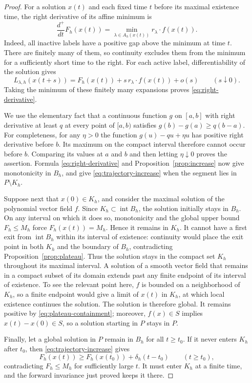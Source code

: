 \begin{proof}
For a solution $x(t)$ and each fixed time $t$ before its maximal
existence time, the right derivative of its affine minimum is
\begin{equation}\label{eq:right-derivative}
 \frac{d^+}{dt}F_h(x(t))
   =\min_{\lambda\in A_h(x(t))}r_\lambda\cdot f(x(t)).
\end{equation}
Indeed, all inactive labels have a positive gap above the minimum at
time $t$.  There are finitely many of them, so continuity excludes
them from the minimum for a sufficiently short time to the right.
For each active label, differentiability of the solution gives
\[
 L_{\lambda,h}(x(t+s))
 =F_h(x(t))+s\,r_\lambda\cdot f(x(t))+o(s)
 \qquad(s\downarrow0).
\]
Taking the minimum of these finitely many expansions proves
\eqref{eq:right-derivative}.

We use the elementary fact that a continuous function $g$ on
$[a,b]$ with right derivative at least $q$ at every point of $[a,b)$
satisfies $g(b)-g(a)\geq q(b-a)$.  For completeness, for any
$\eta>0$ the function $g(u)-qu+\eta u$ has positive right derivative
before $b$.  Its maximum on the compact interval therefore cannot
occur before $b$.  Comparing its values at $a$ and $b$ and then
letting $\eta\downarrow0$ proves the assertion.  Formula
\eqref{eq:right-derivative} and Proposition~\ref{prop:increase} now
give monotonicity in $B_h$, and give \eqref{eq:trajectory-increase}
when the segment lies in $P\setminus K_h$.

Suppose next that $x(0)\in K_h$, and consider the maximal solution of
the polynomial vector field $f$.  Since
$K_h\subset\operatorname{int}B_h$, the solution initially stays in
$B_h$.  On any interval on which it does so, monotonicity and the
global upper bound $F_h\leq M_h$ force
$F_h(x(t))=M_h$.  Hence it remains in $K_h$.  It cannot have a first
exit from $\operatorname{int}B_h$ within its interval of existence:
continuity would place the exit point in both $K_h$ and the boundary
of $B_h$, contradicting Proposition~\ref{prop:plateau}.
Thus the solution stays in the compact set $K_h$ throughout its
maximal interval.  A solution of a smooth vector field that remains
in a compact subset of its domain extends past any finite endpoint
of its interval of existence.  To see the relevant point here, $f$
is bounded on a neighborhood of $K_h$, so a finite endpoint would
give a limit of $x(t)$ in $K_h$, at which local existence continues
the solution.  The solution is therefore global.  It remains
positive by \eqref{eq:plateau-containment}; moreover, $f(x)\in S$
implies $x(t)-x(0)\in S$, so a solution starting in $P$ stays in $P$.

Finally, let a global solution in $P$ remain in $B_h$ for all
$t\geq t_0$.  If it never enters $K_h$ after $t_0$, then
\eqref{eq:trajectory-increase} gives
\[
 F_h(x(t))\geq F_h(x(t_0))+\delta_h(t-t_0)
 \qquad(t\geq t_0),
\]
contradicting $F_h\leq M_h$ for sufficiently large $t$.
It must enter $K_h$ at a finite time, and the forward invariance just
proved keeps it there.
\end{proof}
